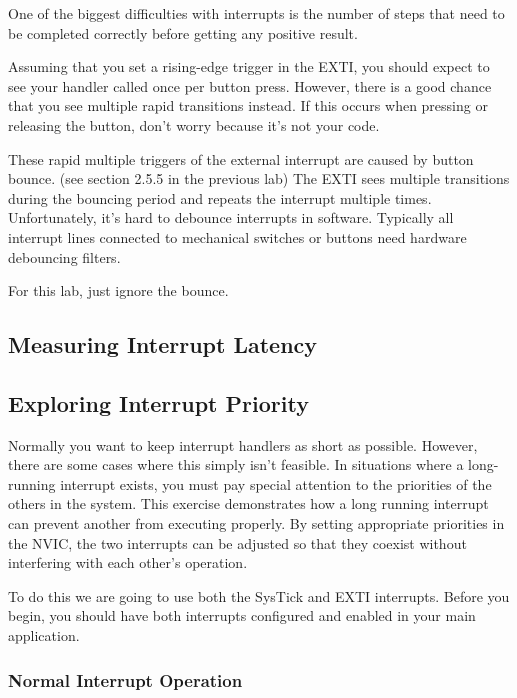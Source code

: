 \documentclass[11pt,fleqn]{book} %
\begin{document}
One of the biggest difficulties with interrupts is the number of steps that need to be completed correctly before getting any positive result. 

Assuming that you set a rising-edge trigger in the EXTI, you should expect to see your handler called once per button press. However, there is a good chance that you see multiple rapid transitions instead. If this occurs when pressing or releasing the button, don't worry because it's not your code.

These rapid multiple triggers of the external interrupt are caused by button bounce. (see section 2.5.5 in the previous lab) The EXTI sees multiple transitions during the bouncing period and repeats the interrupt multiple times. Unfortunately, it's hard to debounce interrupts in software. Typically all interrupt lines connected to mechanical switches or buttons need hardware debouncing filters.

 For this lab, just ignore the bounce.

\subsection{Measuring Interrupt Latency}

\subsection{Exploring Interrupt Priority}
Normally you want to keep interrupt handlers as short as possible. However, there are some cases where this simply isn't feasible. In situations where a long-running interrupt exists, you must pay special attention to the priorities of the others in the system. This exercise demonstrates how a long running interrupt can prevent another from executing properly. By setting appropriate priorities in the NVIC, the two interrupts can be adjusted so that they coexist without interfering with each other's operation. 

To do this we are going to use both the SysTick and EXTI interrupts. Before you begin, you should have both interrupts configured and enabled in your main application.  

\subsubsection{Normal Interrupt Operation}
\end{document}
